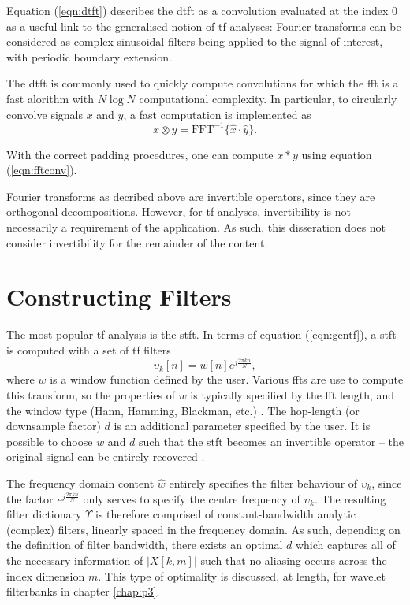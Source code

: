 Equation (\ref{eqn:dtft}) describes the \ac{dtft} as a convolution evaluated at the index 0 as a useful link to the generalised notion of \ac{tf} analyses: Fourier transforms can be considered as complex sinusoidal filters being applied to the signal of interest, with periodic boundary extension.

The \ac{dtft} is commonly used to quickly compute convolutions for which the \ac{fft} is a fast alorithm with $N \log N$ computational complexity. In particular, to circularly convolve signals $x$ and $y$, a fast computation is implemented as
\begin{equation}
    \label{eqn:fftconv}
    x \otimes y = \text{FFT}^{-1}\{\hat{x} \cdot \hat{y}\}.
\end{equation}

With the correct padding procedures, one can compute $x * y$ using equation (\ref{eqn:fftconv}).

Fourier transforms as decribed above are invertible operators, since they are orthogonal decompositions. However, for \ac{tf} analyses, invertibility is not necessarily a requirement of the application. As such, this disseration does not consider invertibility for the remainder of the content.


\section{Constructing Filters}
\label{sec:p1i:tfa}

The most popular \ac{tf} analysis is the \ac{stft}. In terms of equation (\ref{eqn:gentf}), a \ac{stft} is computed with a set of \ac{tf} filters
\begin{equation}
    \label{eqn:stftfilter}
    \upsilon_k[n] =  w[n] e^{j \frac{2\pi k n}{N}},
\end{equation}
where $w$ is a window function defined by the user. Various \acp{fft} are use to compute this transform, so the properties of $w$ is typically specified by the \ac{fft} length, and the window type (Hann, Hamming, Blackman, etc.) \citep{dspbook}. The hop-length (or downsample factor) $d$ is an additional parameter specified by the user. It is possible to choose $w$ and $d$ such that the \ac{stft} becomes an invertible operator -- the original signal can be entirely recovered \citep{stftbook}.

The frequency domain content $\hat{w}$ entirely specifies the filter behaviour of $\upsilon_k$, since the factor $e^{j \frac{2\pi k n}{N}}$ only serves to specify the centre frequency of $\upsilon_k$. The resulting filter dictionary $\Upsilon$ is therefore comprised of constant-bandwidth analytic (complex) filters, linearly spaced in the frequency domain. As such, depending on the definition of filter bandwidth, there exists an optimal $d$ which captures all of the necessary information of $|X[k, m]|$ such that no aliasing occurs across the index dimension $m$. This type of optimality is discussed, at length, for wavelet filterbanks in chapter \ref{chap:p3}.

